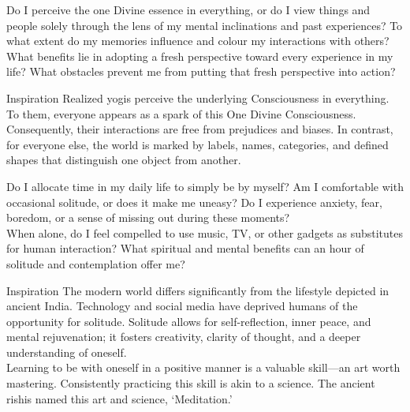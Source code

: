 


\newpage
\begin{mananam}{}
\mananamtext Do I perceive the one Divine essence in everything, or do I view things and people solely through the lens of my mental inclinations and past experiences? To what extent do my memories influence and colour my interactions with others? What benefits lie in adopting a fresh perspective toward every experience in my life? What obstacles prevent me from putting that fresh perspective into action?
\end{mananam}
\WritingHand{}
\begin{inspiration}{\mananamfont Inspiration}
\mananamtext Realized yogis perceive the underlying Consciousness in everything. To them, everyone appears as a spark of this One Divine Consciousness. Consequently, their interactions are free from prejudices and biases. In contrast, for everyone else, the world is marked by labels, names, categories, and defined shapes that distinguish one object from another.
\end{inspiration}
\newpage


\newpage
\begin{mananam}{}
\mananamtext Do I allocate time in my daily life to simply be by myself? Am I comfortable with occasional solitude, or does it make me uneasy? Do I experience anxiety, fear, boredom, or a sense of missing out during these moments?\\
When alone, do I feel compelled to use music, TV, or other gadgets as substitutes for human interaction? What spiritual and mental benefits can an hour of solitude and contemplation offer me?
\end{mananam}
\WritingHand{}
\begin{inspiration}{\mananamfont Inspiration}
\mananamtext The modern world differs significantly from the lifestyle depicted in ancient India. Technology and social media have deprived humans of the opportunity for solitude. Solitude allows for self-reflection, inner peace, and mental rejuvenation; it fosters creativity, clarity of thought, and a deeper understanding of oneself.\\
Learning to be with oneself in a positive manner is a valuable skill—an art worth mastering. Consistently practicing this skill is akin to a science. The ancient rishis named this art and science, ‘Meditation.’
\end{inspiration}
\newpage


